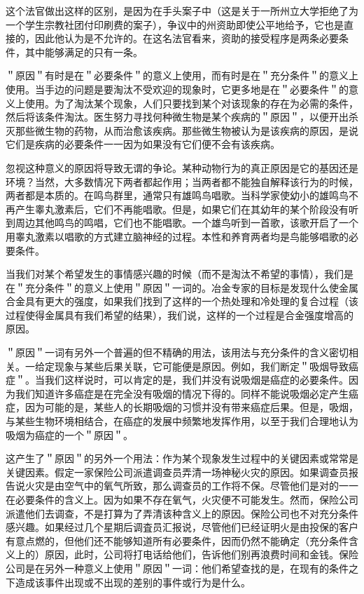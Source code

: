 这个法官做出这样的区别，是因为在手头案子中（这是关于一所州立大学拒绝了为一个学生宗教社团付印刷费的案子），争议中的州资助即使公平地给予，它也是直接的，因此他认为是不允许的。在这名法官看来，资助的接受程序是两条必要条件，其中能够满足的只有一条。

＂原因＂有时是在＂必要条件＂的意义上使用，而有时是在＂充分条件＂的意义上使用。当手边的问题是要淘汰不受欢迎的现象时，它更多地是在＂必要条件＂的意义上使用。为了淘汰某个现象，人们只要找到某个对该现象的存在为必需的条件，然后将该条件淘汰。医生努力寻找何种微生物是某个疾病的＂原因＂，以便开出杀灭那些微生物的药物，从而治愈该疾病。那些微生物被认为是该疾病的原因，是说它们是疾病的必要条件一一因为如果没有它们便不会有该疾病。

忽视这种意义的原因将导致无谓的争论。某种动物行为的真正原因是它的基因还是环境？当然，大多数情况下两者都起作用；当两者都不能独自解释该行为的时候，两者都是本质的。在鸣鸟群里，通常只有雄鸣鸟唱歌。当科学家使幼小的雄鸣鸟不再产生睾丸激素后，它们不再能唱歌。但是，如果它们在其幼年的某个阶段没有听到周边其他鸣鸟的鸣唱，它们也不能唱歌。一个雄鸟听到一首歌，该歌开启了一个用睾丸激素以唱歌的方式建立脑神经的过程。本性和养育两者均是鸟能够唱歌的必要条件。\cite{marler1991}

当我们对某个希望发生的事情感兴趣的时候（而不是淘汰不希望的事情），我们是在＂充分条件＂的意义上使用＂原因＂一词的。冶金专家的目标是发现什么使金属合金具有更大的强度，如果我们找到了这样的一个热处理和冷处理的复合过程（该过程使得金属具有我们希望的结果），我们说，这样的一个过程是合金强度增高的原因。

＂原因＂一词有另外一个普遍的但不精确的用法，该用法与充分条件的含义密切相关。一给定现象与某些后果关联，它可能便是原因。例如，我们断定＂吸烟导致癌症＂。当我们这样说时，可以肯定的是，我们并没有说吸烟是癌症的必要条件。因为我们知道许多癌症是在完全没有吸烟的情况下得的。同样不能说吸烟必定产生癌症，因为可能的是，某些人的长期吸烟的习惯并没有带来癌症后果。但是，吸烟，与某些生物环境相结合，在癌症的发展中频繁地发挥作用，以至于我们合理地认为吸烟为癌症的一个＂原因＂。

这产生了＂原因＂的另外一个用法：作为某个现象发生过程中的关键因素或常常是关键因素。假定一家保险公司派遣调查员弄清一场神秘火灾的原因。如果调查员报告说火灾是由空气中的氧气所致，那么调查员的工作将不保。尽管他们是对的一一在必要条件的含义上。因为如果不存在氧气，火灾便不可能发生。然而，保险公司派遣他们去调查，不是打算为了弄清该种含义上的原因。保险公司也不对充分条件感兴趣。如果经过几个星期后调査员汇报说，尽管他们已经证明火是由投保的客户有意点燃的，但他们还不能够知道所有必要条件，因而仍然不能确定（充分条件含义上的）原因，此时，公司将打电话给他们，告诉他们别再浪费时间和金钱。保险公司是在另外一种意义上使用＂原因＂一词：他们希望查找的是，在现有的条件之下造成该事件出现或不出现的差别的事件或行为是什么。

